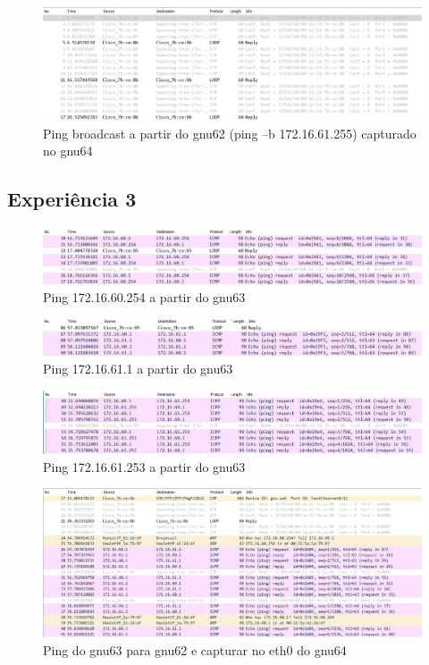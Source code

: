 \documentclass[article, a4paper, 11pt, oneside]{memoir}
\begin{document}
\begin{figure}[h]
	\centering
\includegraphics[scale=0.55]{exp2-step10-broadcast-gnu62-from-gnu64.png}
\caption{Ping broadcast a partir do gnu62 (ping –b 172.16.61.255) capturado no gnu64}
\end{figure}

\newpage
\subsection{Experiência 3}
\begin{figure}[h]
	\centering
\includegraphics[scale=0.55]{exp3-step6-ping-60.254-from-gnu63.png}
\caption{Ping 172.16.60.254 a partir do gnu63}
\end{figure}

\begin{figure}[h]
	\centering
\includegraphics[scale=0.55]{exp3-step6-ping-61.1-from-gnu63.png}
\caption{Ping 172.16.61.1 a partir do gnu63}
\end{figure}

\begin{figure}[h]
	\centering
\includegraphics[scale=0.55]{exp3-step6-ping-61.253-from-gnu63.png}
\caption{Ping 172.16.61.253 a partir do gnu63}
\end{figure}

\newpage
\begin{figure}[h]
	\centering
\includegraphics[scale=0.55]{exp3-step10-ping-gnu62-from-gnu63-eth0.png}
\caption{Ping do gnu63 para gnu62 e capturar no eth0 do gnu64}
\end{figure}
\end{document}
